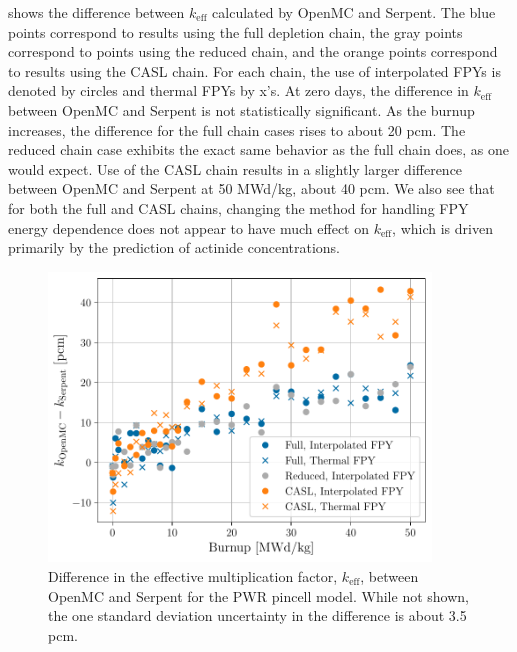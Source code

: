 \documentclass[3p,authoryear]{elsarticle}
\begin{document}
 shows the difference between $k_\text{eff}$ calculated by
OpenMC and Serpent. The blue points correspond to results using the full
depletion chain, the gray points correspond to points using the reduced chain,
and the orange points correspond to results using the CASL chain. For each
chain, the use of interpolated FPYs is denoted by circles and thermal FPYs by
x's. At zero days, the difference in $k_\text{eff}$ between OpenMC and Serpent
is not statistically significant. As the burnup increases, the difference for
the full chain cases rises to about 20 pcm. The reduced chain case exhibits the
exact same behavior as the full chain does, as one would expect. Use of the CASL
chain results in a slightly larger difference between OpenMC and Serpent at 50
MWd/kg, about 40 pcm. We also see that for both the full and CASL chains,
changing the method for handling FPY energy dependence does not appear to have
much effect on $k_\text{eff}$, which is driven primarily by the prediction of
actinide concentrations.
\begin{figure}[H]
  \centering
  \includegraphics[width=4in]{figures/pwr_keff.pdf}
  \caption{Difference in the effective multiplication factor, $k_\text{eff}$,
  between OpenMC and Serpent for the PWR pincell model. While not shown, the one
  standard deviation uncertainty in the difference is about 3.5 pcm.}
  \label{fig:pwr-keff}
\end{figure}
\end{document}
